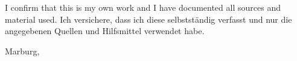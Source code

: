 \thispagestyle{empty}
\vspace*{0.8\textheight}
\noindent
\makeatletter
{}
{I confirm that this \MakeLowercase{\thesistype} is my own work and I have documented all sources and material used.}
{Ich versichere, dass ich diese \thesistype selbstständig verfasst und nur die angegebenen Quellen und Hilfsmittel verwendet habe.}
\makeatother

\vspace{15mm}
\noindent
Marburg, \submdate \hfill \student

\cleardoublepage{}